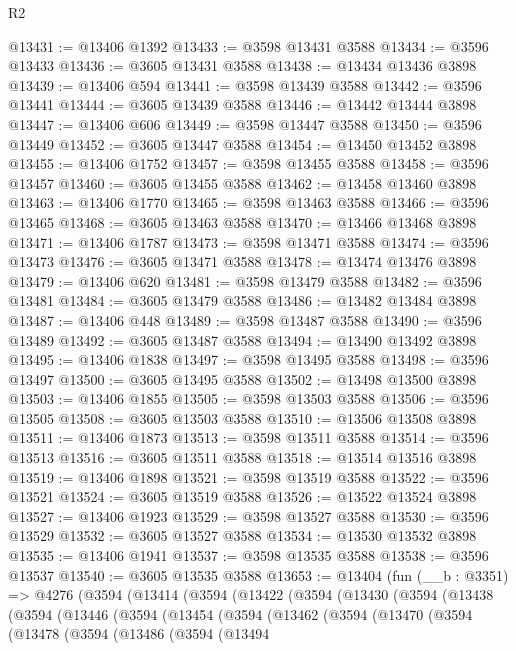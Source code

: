 \begin{lexlean}{R2}
\begin{coremodule}
@13431 := @13406 @1392
@13433 := @3598 @13431 @3588
@13434 := @3596 @13433
@13436 := @3605 @13431 @3588
@13438 := @13434 @13436 @3898
@13439 := @13406 @594
@13441 := @3598 @13439 @3588
@13442 := @3596 @13441
@13444 := @3605 @13439 @3588
@13446 := @13442 @13444 @3898
@13447 := @13406 @606
@13449 := @3598 @13447 @3588
@13450 := @3596 @13449
@13452 := @3605 @13447 @3588
@13454 := @13450 @13452 @3898
@13455 := @13406 @1752
@13457 := @3598 @13455 @3588
@13458 := @3596 @13457
@13460 := @3605 @13455 @3588
@13462 := @13458 @13460 @3898
@13463 := @13406 @1770
@13465 := @3598 @13463 @3588
@13466 := @3596 @13465
@13468 := @3605 @13463 @3588
@13470 := @13466 @13468 @3898
@13471 := @13406 @1787
@13473 := @3598 @13471 @3588
@13474 := @3596 @13473
@13476 := @3605 @13471 @3588
@13478 := @13474 @13476 @3898
@13479 := @13406 @620
@13481 := @3598 @13479 @3588
@13482 := @3596 @13481
@13484 := @3605 @13479 @3588
@13486 := @13482 @13484 @3898
@13487 := @13406 @448
@13489 := @3598 @13487 @3588
@13490 := @3596 @13489
@13492 := @3605 @13487 @3588
@13494 := @13490 @13492 @3898
@13495 := @13406 @1838
@13497 := @3598 @13495 @3588
@13498 := @3596 @13497
@13500 := @3605 @13495 @3588
@13502 := @13498 @13500 @3898
@13503 := @13406 @1855
@13505 := @3598 @13503 @3588
@13506 := @3596 @13505
@13508 := @3605 @13503 @3588
@13510 := @13506 @13508 @3898
@13511 := @13406 @1873
@13513 := @3598 @13511 @3588
@13514 := @3596 @13513
@13516 := @3605 @13511 @3588
@13518 := @13514 @13516 @3898
@13519 := @13406 @1898
@13521 := @3598 @13519 @3588
@13522 := @3596 @13521
@13524 := @3605 @13519 @3588
@13526 := @13522 @13524 @3898
@13527 := @13406 @1923
@13529 := @3598 @13527 @3588
@13530 := @3596 @13529
@13532 := @3605 @13527 @3588
@13534 := @13530 @13532 @3898
@13535 := @13406 @1941
@13537 := @3598 @13535 @3588
@13538 := @3596 @13537
@13540 := @3605 @13535 @3588
@13653 := @13404
    (fun (__b : @3351) =>
    @4276
      (@3594
        (@13414
          (@3594
            (@13422
              (@3594
                (@13430
                  (@3594
                    (@13438
                      (@3594
                        (@13446
                          (@3594
                            (@13454
                              (@3594
                                (@13462
                                  (@3594
                                    (@13470
                                      (@3594
                                        (@13478
                                          (@3594
                                            (@13486
                                              (@3594
                                                (@13494

\end{coremodule}
\end{lexlean}
